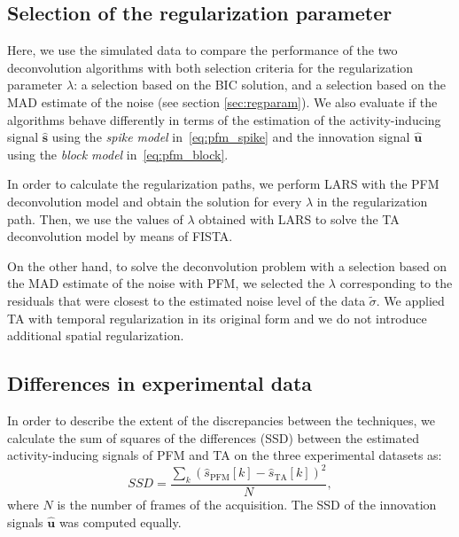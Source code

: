 \subsection{Selection of the regularization parameter}

Here, we use the simulated data to compare the performance of the two deconvolution algorithms with both selection criteria for the regularization parameter $\lambda$: a selection based on the BIC solution, and a selection based on the MAD estimate of the noise (see section \ref{sec:regparam}). We also evaluate if the algorithms behave differently in terms of the estimation of the activity-inducing signal $\mathbf{\hat{s}}$ using the \textit{spike model} in~\eqref{eq:pfm_spike} and the innovation signal $\mathbf{\hat{u}}$ using the \textit{block model} in~\eqref{eq:pfm_block}.

In order to calculate the regularization paths, we perform LARS with the PFM deconvolution model and obtain the solution for every $\lambda$ in the regularization path. Then, we use the values of $\lambda$ obtained with LARS to solve the TA deconvolution model by means of FISTA.

On the other hand, to solve the deconvolution problem with a selection based on the MAD estimate of the noise with PFM, we selected the $\lambda$ corresponding to the residuals that were closest to the estimated noise level of the data $\tilde{\sigma}$. We applied TA with temporal regularization in its original form and we do not introduce additional spatial regularization.

\subsection{Differences in experimental data}

In order to describe the extent of the discrepancies between the techniques, we calculate the sum of squares of the differences (SSD) between the estimated activity-inducing signals of PFM and TA on the three experimental datasets as:
\begin{equation}
    SSD = \frac{\sum_{k}{(\hat{s}_\text{PFM}[k] - \hat{s}_\text{TA}[k])^2}}{N},
\end{equation}
where $N$ is the number of frames of the acquisition. The SSD of the innovation signals $\mathbf{\hat{u}}$ was computed equally.


